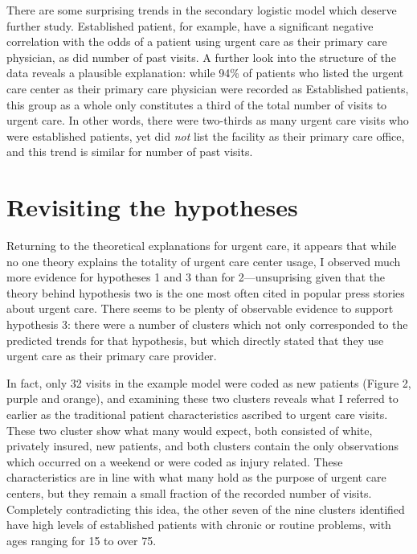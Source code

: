 \documentclass[12pt,twoside]{reedthesis}
\begin{document}
  There are some surprising trends in the secondary logistic model which
  deserve further study. Established patient, for example, have a
  significant negative correlation with the odds of a patient using urgent
  care as their primary care physician, as did number of past visits. A
  further look into the structure of the data reveals a plausible
  explanation: while 94\% of patients who listed the urgent care center as
  their primary care physician were recorded as Established patients, this
  group as a whole only constitutes a third of the total number of visits
  to urgent care. In other words, there were two-thirds as many urgent
  care visits who were established patients, yet did \emph{not} list the
  facility as their primary care office, and this trend is similar for
  number of past visits.
  
  \section*{Revisiting the hypotheses}\label{revisiting-the-hypotheses}
  
  \doublespacing
  
  Returning to the theoretical explanations for urgent care, it appears
  that while no one theory explains the totality of urgent care center
  usage, I observed much more evidence for hypotheses 1 and 3 than for
  2---unsuprising given that the theory behind hypothesis two is the one
  most often cited in popular press stories about urgent care. There seems
  to be plenty of observable evidence to support hypothesis 3: there were
  a number of clusters which not only corresponded to the predicted trends
  for that hypothesis, but which directly stated that they use urgent care
  as their primary care provider.
  
  In fact, only 32 visits in the example model were coded as new patients
  (Figure 2, purple and orange), and examining these two clusters reveals
  what I referred to earlier as the traditional patient characteristics
  ascribed to urgent care visits. These two cluster show what many would
  expect, both consisted of white, privately insured, new patients, and
  both clusters contain the only observations which occurred on a weekend
  or were coded as injury related. These characteristics are in line with
  what many hold as the purpose of urgent care centers, but they remain a
  small fraction of the recorded number of visits. Completely
  contradicting this idea, the other seven of the nine clusters identified
  have high levels of established patients with chronic or routine
  problems, with ages ranging for 15 to over 75.
  
\end{document}
